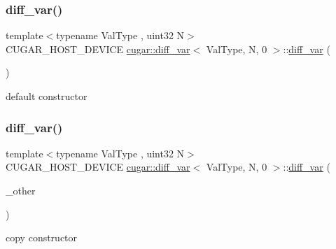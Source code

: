 \subsubsection{\texorpdfstring{diff\+\_\+var()}{diff\_var()}\hspace{0.1cm}{\footnotesize\ttfamily [1/3]}}
{\footnotesize\ttfamily template$<$typename Val\+Type , uint32 N$>$ \\
C\+U\+G\+A\+R\+\_\+\+H\+O\+S\+T\+\_\+\+D\+E\+V\+I\+CE \hyperlink{structcugar_1_1diff__var}{cugar\+::diff\+\_\+var}$<$ Val\+Type, N, 0 $>$\+::\hyperlink{structcugar_1_1diff__var}{diff\+\_\+var} (\begin{DoxyParamCaption}{ }\end{DoxyParamCaption})\hspace{0.3cm}{\ttfamily [inline]}}

default constructor \mbox{\label{structcugar_1_1diff__var_3_01_val_type_00_01_n_00_010_01_4_ad5a4448d6e691d1d15af2a05936c6dc5}} 
\subsubsection{\texorpdfstring{diff\+\_\+var()}{diff\_var()}\hspace{0.1cm}{\footnotesize\ttfamily [2/3]}}
{\footnotesize\ttfamily template$<$typename Val\+Type , uint32 N$>$ \\
C\+U\+G\+A\+R\+\_\+\+H\+O\+S\+T\+\_\+\+D\+E\+V\+I\+CE \hyperlink{structcugar_1_1diff__var}{cugar\+::diff\+\_\+var}$<$ Val\+Type, N, 0 $>$\+::\hyperlink{structcugar_1_1diff__var}{diff\+\_\+var} (\begin{DoxyParamCaption}\item[{const \hyperlink{structcugar_1_1diff__var}{diff\+\_\+var}$<$ Val\+Type, N, 0 $>$ \&}]{\+\_\+other }\end{DoxyParamCaption})\hspace{0.3cm}{\ttfamily [inline]}}

copy constructor \mbox{\label{structcugar_1_1diff__var_3_01_val_type_00_01_n_00_010_01_4_a329ee3199e0e1b74e6980d77ac096f4d}} 
